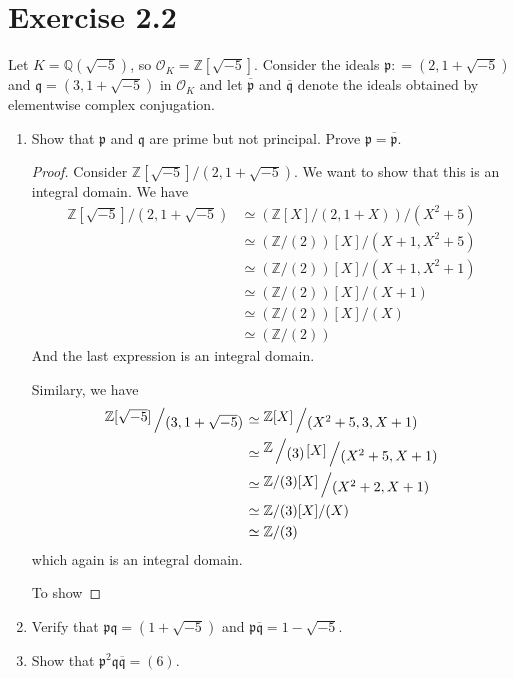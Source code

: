 \documentclass[a4paper]{article}
\newcommand{\bigslant}[2]{{\raisebox{.2em}{$#1$}\left/\raisebox{-.2em}{$#2$}\right.}}
\begin{document}
\section*{Exercise 2.2}
Let \(K = \mathbb{Q}(\sqrt{-5})\), so \(\mathcal{O}_K = \mathbb{Z}[\sqrt{-5}]\). Consider the ideals \(\mathfrak{p}: = (2, 1 + \sqrt{-5})\) and \(\mathfrak{q} = (3, 1 + \sqrt{-5})\) in \(\mathcal{O}_K\) and let \(\overline{\mathfrak{p}}\) and \(\overline{\mathfrak{q}}\) denote the ideals obtained by elementwise complex conjugation.
\begin{enumerate}
  \item Show that \(\mathfrak{p}\) and \(\mathfrak{q}\) are prime but not principal. Prove \(\mathfrak{p} = \overline{\mathfrak{p}}\).
  \begin{proof}
    Consider \(\mathbb{Z}[\sqrt{-5}] / (2, 1 + \sqrt{-5})\). We want to show that this is an integral domain. We have
    \begin{align*}
      \mathbb{Z}[\sqrt{-5}] / (2, 1 + \sqrt{-5}) &\simeq (\mathbb{Z}[X] / (2, 1 + X)) / (X^2 + 5) \\
      & \simeq (\mathbb{Z} / (2)) [X] / (X + 1, X^2 + 5) \\
      & \simeq (\mathbb{Z} / (2)) [X] / (X + 1, X^2 + 1) \\
      & \simeq (\mathbb{Z} / (2)) [X] / (X + 1) \\
      & \simeq (\mathbb{Z} / (2)) [X] / (X) \\
      & \simeq (\mathbb{Z} / (2))
    \end{align*}
    And the last expression is an integral domain.

    Similary, we have
    \begin{align*}
      \bigslant{\mathbb{Z}[\sqrt{-5}]}{(3, 1 + \sqrt{-5})} &\simeq \bigslant{\mathbb{Z}[X]}{(X^2 + 5, 3, X + 1)} \\
      &\simeq \bigslant{\bigslant{\mathbb{Z}}{(3)}[X]}{(X^2 +5, X + 1)}\\
      &\simeq \bigslant{\mathbb{Z}/(3) [X]}{(X^2 + 2, X + 1)} \\
      &\simeq \mathbb{Z} / (3) [X] / (X) \\
      &\simeq \mathbb{Z} / (3)
    \end{align*}
    which again is an integral domain.

    To show 
  \end{proof}
  \item Verify that \(\mathfrak{p}\mathfrak{q} = (1 + \sqrt{-5})\) and \(\mathfrak{p}\overline{\mathfrak{q}} = 1 - \sqrt{-5}\).
  \item Show that \(\mathfrak{p}^2 \mathfrak{q}\overline{\mathfrak{q}} = (6)\).
\end{enumerate}
\end{document}
